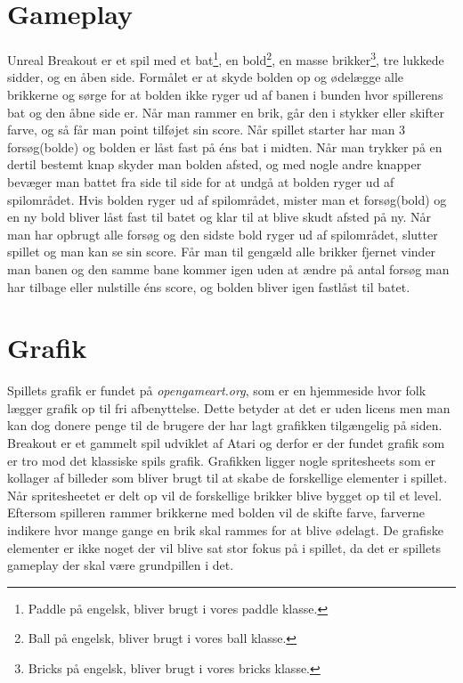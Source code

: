 
\section{Gameplay}
Unreal Breakout er et spil med et bat\footnote{Paddle på engelsk, bliver brugt i vores paddle klasse.}, en bold\footnote{Ball på engelsk, bliver brugt i vores ball klasse.}, en masse brikker\footnote{Bricks på engelsk, bliver brugt i vores bricks klasse.}, tre lukkede sidder, og en åben side. Formålet er at skyde bolden op og ødelægge alle brikkerne og sørge for at bolden ikke ryger ud af banen i bunden hvor spillerens bat og den åbne side er. Når man rammer en brik, går den i stykker eller skifter farve, og så får man point tilføjet sin score. Når spillet starter har man 3 forsøg(bolde) og bolden er låst fast på éns bat i midten. Når man trykker på en dertil bestemt knap skyder man bolden afsted, og med nogle andre knapper bevæger man battet fra side til side for at undgå at bolden ryger ud af spilområdet. Hvis bolden ryger ud af spilområdet, mister man et forsøg(bold) og en ny bold bliver låst fast til batet og klar til at blive skudt afsted på ny. Når man har opbrugt alle forsøg og den sidste bold ryger ud af spilområdet, slutter spillet og man kan se sin score. Får man til gengæld alle brikker fjernet vinder man banen og den samme bane kommer igen uden at ændre på antal forsøg man har tilbage eller nulstille éns score, og bolden bliver igen fastlåst til batet.

\section{Grafik}

Spillets grafik er fundet på \textit{opengameart.org}, som er en hjemmeside hvor folk lægger grafik op til fri afbenyttelse. Dette betyder at det er uden licens men man kan dog donere penge til de brugere der har lagt grafikken tilgængelig på siden. \newline
Breakout er et gammelt spil udviklet af Atari og derfor er der fundet grafik som er tro mod det klassiske spils grafik. Grafikken ligger nogle spritesheets som er kollager af billeder som bliver brugt til at skabe de forskellige elementer i spillet. Når spritesheetet er delt op vil de forskellige brikker blive bygget op til et level. Eftersom spilleren rammer brikkerne med bolden vil de skifte farve, farverne indikere hvor mange gange en brik skal rammes for at blive ødelagt. De grafiske elementer er ikke noget der vil blive sat stor fokus på i spillet, da det er spillets gameplay der skal være grundpillen i det. 
